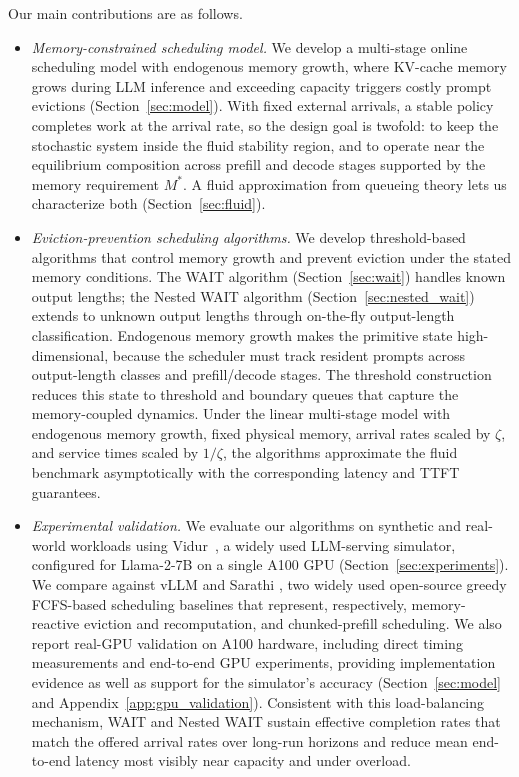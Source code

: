 Our main contributions are as follows.
\begin{itemize}
    \item \emph{Memory-constrained scheduling model.} We develop a multi-stage online scheduling model with endogenous memory growth, where KV-cache memory grows during LLM inference and exceeding capacity triggers costly prompt evictions (Section~\ref{sec:model}). With fixed external arrivals, a stable policy completes work at the arrival rate, so the design goal is twofold: to keep the stochastic system inside the fluid stability region, and to operate near the equilibrium composition across prefill and decode stages supported by the memory requirement \(M^*\). A fluid approximation from queueing theory lets us characterize both (Section~\ref{sec:fluid}).
    \item \emph{Eviction-prevention scheduling algorithms.} We develop threshold-based algorithms that control memory growth and prevent eviction under the stated memory conditions. The WAIT algorithm (Section~\ref{sec:wait}) handles known output lengths; the Nested WAIT algorithm (Section~\ref{sec:nested_wait}) extends to unknown output lengths through on-the-fly output-length classification. Endogenous memory growth makes the primitive state high-dimensional, because the scheduler must track resident prompts across output-length classes and prefill/decode stages. The threshold construction reduces this state to threshold and boundary queues that capture the memory-coupled dynamics. Under the linear multi-stage model with endogenous memory growth, fixed physical memory, arrival rates scaled by \(\zeta\), and service times scaled by \(1/\zeta\), the algorithms approximate the fluid benchmark asymptotically with the corresponding latency and TTFT guarantees.
    \item \emph{Experimental validation.} We evaluate our algorithms on synthetic and real-world workloads using Vidur~\citep{agrawal2024vidur}, a widely used LLM-serving simulator, configured for Llama-2-7B on a single A100 GPU (Section~\ref{sec:experiments}). We compare against vLLM \citep{kwon2023efficient} and Sarathi \citep{agrawal2023sarathi}, two widely used open-source greedy FCFS-based scheduling baselines that represent, respectively, memory-reactive eviction and recomputation, and chunked-prefill scheduling. We also report real-GPU validation on A100 hardware, including direct timing measurements and end-to-end GPU experiments, providing implementation evidence as well as support for the simulator's accuracy (Section~\ref{sec:model} and Appendix~\ref{app:gpu_validation}). Consistent with this load-balancing mechanism, WAIT and Nested WAIT sustain effective completion rates that match the offered arrival rates over long-run horizons and reduce mean end-to-end latency most visibly near capacity and under overload.
\end{itemize}
